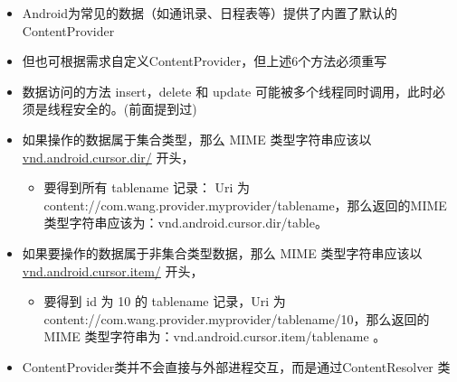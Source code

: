 \documentclass[9pt, b5paper]{article}
\begin{document}
\begin{itemize}
\item Android为常见的数据（如通讯录、日程表等）提供了内置了默认的ContentProvider
\item 但也可根据需求自定义ContentProvider，但上述6个方法必须重写
\item 数据访问的方法 insert，delete 和 update 可能被多个线程同时调用，此时必须是线程安全的。(前面提到过)
\item 如果操作的数据属于集合类型，那么 MIME 类型字符串应该以 \uline{vnd.android.cursor.dir/} 开头，
\begin{itemize}
\item 要得到所有 tablename 记录： Uri 为 content://com.wang.provider.myprovider/tablename，那么返回的MIME类型字符串应该为：vnd.android.cursor.dir/table。
\end{itemize}
\item 如果要操作的数据属于非集合类型数据，那么 MIME 类型字符串应该以 \uline{vnd.android.cursor.item/} 开头，
\begin{itemize}
\item 要得到 id 为 10 的 tablename 记录，Uri 为 content://com.wang.provider.myprovider/tablename/10，那么返回的 MIME 类型字符串为：vnd.android.cursor.item/tablename 。
\end{itemize}

\item ContentProvider类并不会直接与外部进程交互，而是通过ContentResolver 类
\end{itemize}
\end{document}
